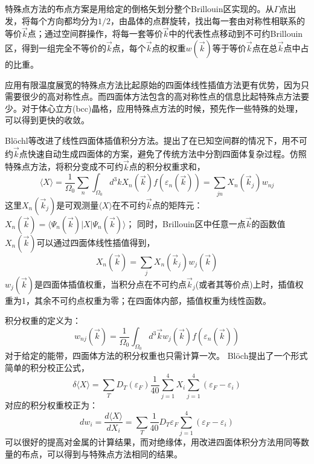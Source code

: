 特殊点方法的布点方案是用给定的倒格矢划分整个Brillouin区实现的。从$\Gamma$点出发，将每个方向都均分为$1/2$，由晶体的点群旋转，找出每一套由对称性相联系的等价$\vec k$点；通过空间群操作，将每一套等价$\vec k$中的代表性点移动到不可约Brillouin区，得到一组完全不等价的$\vec k$点，每个$\vec k$点的权重$w(\vec k)$等于等价$\vec k$点在总$\vec k$点中占的比重。

应用有限温度展宽的特殊点方法比起原始的四面体线性插值方法更有优势，因为只需要很少的高对称性点。而四面体方法包含的高对称性点的信息比起特殊点方法要少。对于体心立方(bcc)晶格，应用特殊点方法的时候，预先作一些特殊的处理，可以得到更快的收敛\cite{PRB8-5747_1973,Cohen-unpub}。

Bl\"ochl等改进了线性四面体插值积分方法\cite{PRB49-16223_1994}。提出了在已知空间群的情况下，用不可约$\vec k$点快速自动生成四面体的方案，避免了传统方法中分割四面体复杂过程。仿照特殊点方法，将积分变成不可约$\vec k$点的积分权重求和，
\begin{equation}
  \langle X\rangle=\frac1{\Omega_0}\sum_n\int_{\Omega_0}d^3kX_n(\vec k)f(\varepsilon_n(\vec k))=\sum_{jn}X_n(\vec k_j)w_{nj}
  \label{eq:solid-207}
\end{equation}
这里$X_n(\vec k_j)$是可观测量$\langle X\rangle$在不可约$\vec k$点的矩阵元：$X_n(\vec k)=\langle\Psi_n(\vec k)|X|\Psi_n(\vec k)\rangle$；
同时，Brillouin区中任意一点$\vec k$的函数值$X_n(\vec k)$可以通过四面体线性插值得到，
\begin{equation}
  X_n(\vec k)=\sum_jX_n(\vec k_j)w_j(\vec k)
  \label{eq:solid-208}
\end{equation}
$w_j(\vec k)$是四面体插值权重，当积分点在不可约点$\vec k_j$(或者其等价点)上时，插值权重为1，其余不可约点权重为零；在四面体内部，插值权重为线性函数。

积分权重的定义为：
$$w_{nj}(\vec k)=\frac1{\Omega_0}\int_{\Omega_0}d^3\vec kw_j(\vec k)f(\varepsilon_n(\vec k))$$
对于给定的能带，四面体方法的积分权重也只需计算一次。
Bl\"och提出了一个形式简单的积分校正公式，
\begin{equation}
  \delta\langle X\rangle=\sum_TD_T(\varepsilon_F)\frac1{40}\sum_{j=1}^4X_i\sum_{j=1}^4(\varepsilon_F-\varepsilon_i)
  \label{eq:solid-205}
\end{equation}
对应的积分权重校正为：
\begin{equation}
  dw_i=\frac{d\langle X\rangle}{d X_i}=\sum_T\frac1{40}D_T{\varepsilon_F}\sum_{j=1}^4(\varepsilon_F-\varepsilon_i)
  \label{eq:solid-206}
\end{equation}
可以很好的提高对金属的计算结果，而对绝缘体，用改进四面体积分方法用同等数量的布点，可以得到与特殊点方法相同的结果。


